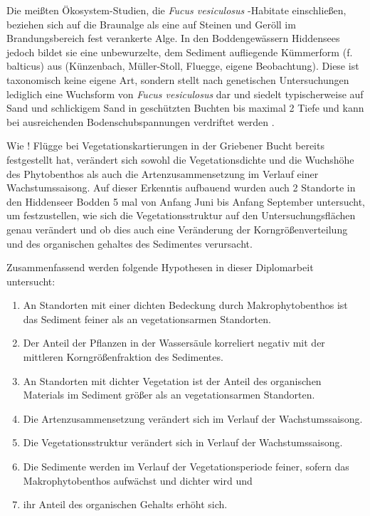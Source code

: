 Die meißten Ökosystem-Studien, die \textit{Fucus vesiculosus} -Habitate einschließen, beziehen sich auf die Braunalge als eine auf Steinen und Geröll im Brandungsbereich fest verankerte Alge.
In den Boddengewässern Hiddensees jedoch bildet sie eine unbewurzelte, dem Sediment aufliegende Kümmerform (f. balticus) aus (Künzenbach, Müller-Stoll, Fluegge, eigene Beobachtung).  Diese ist taxonomisch keine eigene Art, sondern stellt nach genetischen Untersuchungen lediglich eine Wuchsform von \textit{Fucus vesiculosus} dar \citep{athanasiadis_1996} und siedelt typischerweise auf Sand und schlickigem Sand in geschützten Buchten bis maximal \unit{2}{\metre} Tiefe \citep{HELCOM_2013} und kann bei ausreichenden Bodenschubspannungen verdriftet werden \citep{canal-verges_2010}.

Wie ! Flügge bei Vegetationskartierungen in der Griebener Bucht bereits festgestellt hat, verändert sich sowohl die Vegetationsdichte und die Wuchshöhe des Phytobenthos als auch die Artenzusammensetzung im Verlauf einer Wachstumssaisong. Auf dieser Erkenntis aufbauend wurden auch 2 Standorte in den Hiddenseer Bodden 5 mal von Anfang Juni bis Anfang September untersucht, um festzustellen, wie sich die Vegetationsstruktur auf den Untersuchungsflächen genau verändert und ob dies auch eine Veränderung der Korngrößenverteilung und des organischen gehaltes des Sedimentes verursacht.


Zusammenfassend werden folgende Hypothesen in dieser Diplomarbeit untersucht: 
\\
\begin{enumerate}[label=\Roman{*},leftmargin=1.5cm]
\item An Standorten mit einer dichten Bedeckung durch Makrophytobenthos ist das Sediment feiner als an vegetationsarmen Standorten.
\item Der Anteil der Pflanzen in der Wassersäule korreliert negativ mit der mittleren Korngrößenfraktion des Sedimentes.
\item An Standorten mit dichter Vegetation ist der Anteil des organischen Materials im Sediment größer als an vegetationsarmen Standorten.
\item Die Artenzusammensetzung verändert sich im Verlauf der Wachstumssaisong.
\item Die Vegetationsstruktur verändert sich in Verlauf der Wachstumssaisong.
\item Die Sedimente werden im Verlauf der Vegetationsperiode feiner, sofern das Makrophytobenthos aufwächst und dichter wird und 
\item ihr Anteil des organischen Gehalts erhöht sich.
\end{enumerate}
